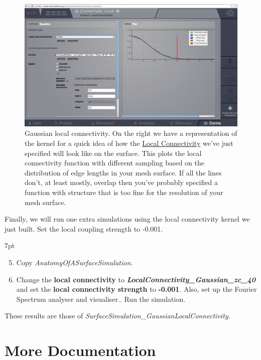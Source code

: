 \documentclass{tufte-handout}
\newenvironment{simulation}{%
  \def\FrameCommand{%
    \hspace{1pt}%
    {\color{ForestGreen}\vrule width 2pt}%
    {\color{simulationshade}\vrule width 4pt}%
    \colorbox{simulationshade}%
  }%
  \MakeFramed{\advance\hsize-\width\FrameRestore}%
  \noindent\hspace{-4.55pt}%
  \begin{adjustwidth}{}{7pt}%
  \vspace{2pt}\vspace{2pt}%
}
{%
  \vspace{2pt}\end{adjustwidth}\endMakeFramed%
}
\begin{document}
\begin{figure}[h]
  \includegraphics[width=\linewidth]{Handout_UI_BuildingYourOwnBrainNetworkModel_YourOwnLocalConnectivity}%
  \caption{Gaussian local connectivity. On the right we have a representation of the
kernel for a quick idea of how the \underline{Local Connectivity} we've just
specified will look like on the surface. This plots the local connectivity
function with different sampling based on the distribution of edge lengths in
your mesh surface. If all the lines don't, at least mostly, overlap then
you've probably specified a function with structure that is too fine for the
resolution of your mesh surface.}%
  \label{fig:lc_gaussian}%
\end{figure}


Finally, we will run one extra simulations using the local connectivity kernel
we just built. Set the local coupling strength to -0.001. 


\begin{simulation}
\begin{enumerate}[resume]
\setcounter{enumi}{4}
\item Copy \textit{AnatomyOfASurfaceSimulation}.
\item Change the \textbf{local connectivity} to \textbf{\textit{LocalConnectivity\_Gaussian\_zc\_40}} and set the \textbf{local connectivity strength} to \textbf{-0.001}. Also, set up the
Fourier Spectrum analyser and visualiser.. Run the simulation.
\end{enumerate}
\end{simulation}

These results are those of \textit{SurfaceSimulation\_GaussianLocalConnectivity}.
 

\section{More Documentation}\label{sec:more-doc}
\end{document}
